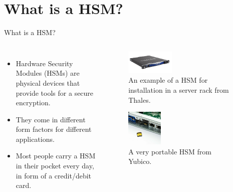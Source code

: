 \section{What is a HSM?}
\begin{frame}{What is a HSM?}
    \begin{wide}
    \begin{columns}[c]
            \begin{itemize}
                \item{Hardware Security Modules (HSMs) are physical devices that provide tools for a secure encryption.}
                \item{They come in different form factors for different applications.}
                \item{Most people carry a HSM in their pocket every day, in form of a credit/debit card.}
            \end{itemize}

            \begin{block}
                \begin{figure}
                    \centering
                    \includegraphics[width=0.4\textwidth]{figures/hsm-server.png}
                    \caption{An example of a HSM for installation in a server rack from Thales\footnotemark[1].}
                \end{figure}
                \begin{figure}
                    \centering
                    \includegraphics[width=0.3\textwidth]{figures/yubi-micro.jpg}
                    \caption{A very portable HSM from Yubico\footnotemark[2].}
                \end{figure}
            \end{block}




        \end{columns}
\end{wide}
\end{frame}